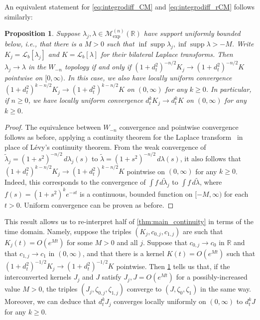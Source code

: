 \documentclass{cams-l} %
\newcommand{\dave}[1]{#1}\newcommand{\davebegin}{}\newcommand{\daveend}{}\newcommand{\george}[1]{#1}
\newcommand{\RR}{\mathbb R}
\newcommand{\cL}{\mathcal L}
\newcommand{\cM}{\mathcal M}
\newcommand{\supp}{\operatorname{supp}}
\newtheorem{proposition}[theorem]{Proposition}
\theoremstyle{definition}
\theoremstyle{remark}
\numberwithin{equation}{section}
\begin{document}
\dave{An equivalent} statement for \ref{eq:integrodiff_CM} and \ref{eq:integrodiff_rCM} follows similarly:
\begin{proposition}\label{prop:time_cont_CM}
    Suppose $\lambda_j,\lambda\in\cM_\mathrm{exp}^{(n)}(\RR)$ have support uniformly bounded below, i.e., that there is a $M>0$ such that $\inf\supp\lambda_j,\inf\supp\lambda > -M$. Write $K_j=\cL_b[\lambda_j]$ and $K=\cL_b[\lambda]$ for their bilateral Laplace transforms. Then $\lambda_j\to\lambda$ in the $W_{-n}$ topology if and only if $(1+d_t^2)^{-n/2}K_j\to (1+d_t^2)^{-n/2}K$ pointwise on $[0,\infty)$. In this case, we also have locally uniform convergence $(1+d_t^2)^{k-n/2}K_j\to (1+d_t^2)^{k-n/2}K$ on $(0,\infty)$ for any $k\geq 0$. In particular, if $n\geq 0$, we have locally uniform convergence $d_t^kK_j\to d_t^k K$ on $(0,\infty)$ for any $k\geq 0$.%
\end{proposition}
\begin{proof}
    The equivalence between $W_{-n}$ convergence and pointwise convergence follows as before, applying a continuity theorem for the Laplace transform~\cite[Ex.~5.5]{billingsley2013convergence} in place of L\'evy's continuity theorem. From the weak convergence of $\widetilde{\lambda}_j = (1+s^2)^{-n/2}\,d\lambda_j(s)$ to $\widetilde{\lambda} = (1+s^2)^{-n/2}\,d\lambda(s)$, it also follows that $(1+d_t^2)^{k-n/2}K_j\to (1+d_t^2)^{k-n/2}K$ pointwise on $(0,\infty)$ for any $k\geq 0$. Indeed, this corresponds to the convergence of $\int f\,d\widetilde{\lambda}_j$ to $\int f\,d\widetilde{\lambda}$, where $f(s) = (1+s^2)^{k}e^{-st}$ is a continuous, bounded function on $[-M,\infty)$ for each $t>0$. Uniform convergence can be proven as before.
\end{proof}

This result allows us to re-interpret half of \cref{thm:main_continuity} in terms of the time domain. Namely, suppose the triples $(K_j,c_{0,j},c_{1,j})$ are such that $K_j(t) = O(e^{Mt})$ for some $M>0$ and all $j$. Suppose that $c_{0,j}\to c_0$ in $\RR$ and that $c_{1,j}\to c_1$ in $(0,\infty)$, and that there is a kernel $K(t)=O(e^{Mt})$ such that $(1+d_t^2)^{-1/2}K_j\to (1+d_t^2)^{-1/2}K$ pointwise. Then \cref{prop:time_cont_CM} tells us that, if the interconverted kernels $J_j$ and $J$ satisfy $J_j,J = O(e^{Mt})$ for a possibly-increased value $M>0$, the triples $(J_j,\zeta_{0,j},\zeta_{1,j})$ converge to $(J,\zeta_0,\zeta_1)$ in the same way. Moreover, we can deduce that $d_t^kJ_j$ converges locally uniformly on $(0,\infty)$ to $d_t^k J$ for any $k\geq 0$.
\end{document}
